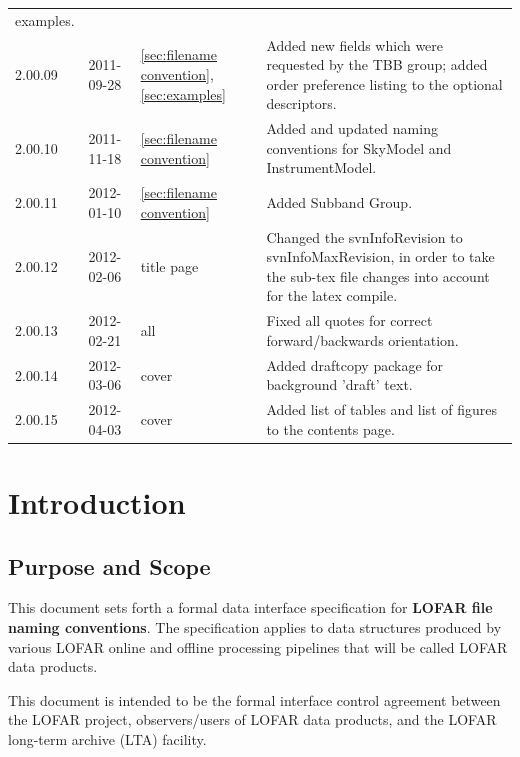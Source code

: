 \documentclass[a4paper,10pt,bibtotoc]{scrartcl}
\begin{document}
\begin{center}
\begin{supertabular}{lllp{10cm}}
    examples. \\
    2.00.09 & 2011-09-28 & \ref{sec:filename convention}, \ref{sec:examples} & Added new
    fields which were requested by the TBB group;  added order preference 
    listing to the optional descriptors.  \\
    2.00.10 & 2011-11-18 & \ref{sec:filename convention} & Added and updated naming conventions for SkyModel and InstrumentModel.  \\
    2.00.11 & 2012-01-10 & \ref{sec:filename convention} & Added Subband Group.  \\
    2.00.12 & 2012-02-06 & title page & Changed the svnInfoRevision to svnInfoMaxRevision, in order to take the sub-tex file changes into account for the latex compile. \\
    2.00.13 & 2012-02-21 & all & Fixed all quotes for correct forward/backwards orientation.  \\
    2.00.14 & 2012-03-06 & cover   & Added draftcopy package for background 'draft' text.\\
    2.00.15 & 2012-04-03 & cover   & Added list of tables and list of figures to the contents page.\\

\end{supertabular}
\end{center}

\clearpage


\section{Introduction}
\label{sec:introduction}

\subsection{Purpose and Scope}

This document sets forth a formal data interface specification for
\textbf{LOFAR file naming conventions}. The specification applies to data
structures produced by various LOFAR online and offline processing 
pipelines that will be called LOFAR data products.

This document is intended to be the formal interface control agreement
between the LOFAR project, observers/users of LOFAR data products, and
the LOFAR long-term archive (LTA) facility.
\end{document}
